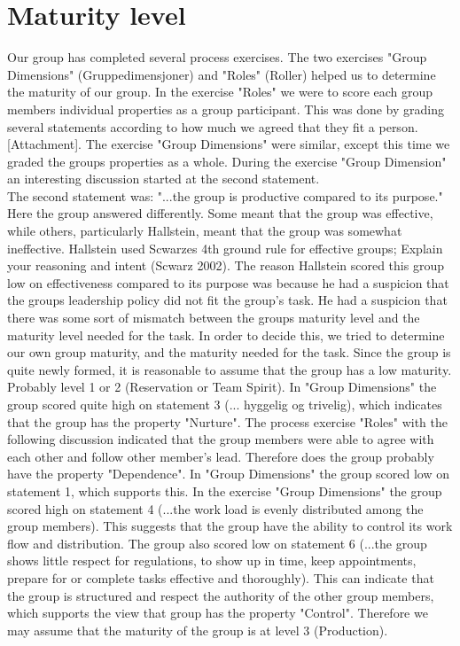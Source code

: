 \section{Maturity level}
Our group has completed several process exercises. The two exercises "Group Dimensions" (Gruppedimensjoner) and "Roles" (Roller) helped us to determine the  maturity of our group. In the exercise "Roles" we were to score each group members individual properties as a group participant. This was done by grading several statements according to how much we agreed that they fit a person. [Attachment]. The exercise "Group Dimensions" were similar, except this time we graded the groups properties as a whole. During the exercise "Group Dimension" an interesting discussion started at the second statement. 
\\
The second statement was: "...the group is productive compared to its purpose." Here the group answered differently. Some meant that the group was effective, while others, particularly Hallstein, meant that the group was somewhat ineffective. Hallstein used Scwarzes 4th ground rule for effective groups; Explain your reasoning and intent (Scwarz 2002). The reason Hallstein scored this group low on effectiveness compared to its purpose was because he had a suspicion that the groups leadership policy did not fit the group's task. He had a suspicion that there was some sort of mismatch between the groups maturity level and the maturity level needed for the task. In order to decide this, we tried to determine our own group maturity, and the maturity needed for the task.  
	Since the group is quite newly formed, it is reasonable to assume that the group has a low maturity. Probably level 1 or 2 (Reservation or Team Spirit). In "Group Dimensions" the group scored quite high on statement 3 (... hyggelig og trivelig), which indicates that the group has the property "Nurture". The process exercise "Roles" with the following discussion indicated that the group members were able to agree with each other and follow other member's lead. Therefore does the group probably have the property "Dependence". In "Group Dimensions" the group scored low on statement 1, which supports this. 
	In the exercise "Group Dimensions" the group scored high on statement 4 (...the work load is evenly distributed among the group members). This suggests that the group have the ability to control its work flow and distribution. The group also scored low on statement 6 (...the group shows little respect for regulations, to show up in time, keep appointments, prepare for or complete tasks effective and thoroughly). This can indicate that the group is structured and respect the authority of the other group members, which supports the view that group has the property "Control". Therefore we may assume that the maturity of the group is at level 3 (Production).
